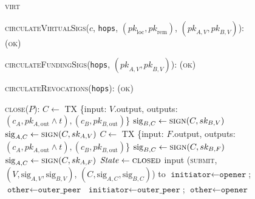 \begin{figure}[H]
\begin{processbox}{\textsc{virt}}
\begin{algorithmic}[1]
      \State \textsc{circulateVirtualSigs}($c$, \texttt{hops},
      $(\textit{pk}_\mathrm{loc}, \textit{pk}_\mathrm{rem})$, $(\textit{pk}_{A,
      V}, \textit{pk}_{B, V})$):
      \Indent
        \State \Return (\textsc{ok})
      \EndIndent
      \Statex

      \State \textsc{circulateFundingSigs}(\texttt{hops}, $(\textit{pk}_{A, V},
      \textit{pk}_{B, V})$):
      \Indent
        \State \Return (\textsc{ok})
      \EndIndent
      \Statex

      \State \textsc{circulateRevocations}(\texttt{hops}):
      \Indent
        \State \Return (\textsc{ok})
      \EndIndent
      \Statex

      \State \textsc{close}($P$):
            \State {}
            \State $C \gets$ TX \{input: $V$.output, outputs: $(c_A, pk_{A,
            \mathrm{out}} \wedge t), (c_B, pk_{B, \mathrm{out}})$\}
            \State $\mathrm{sig}_{B, C} \gets \textsc{sign}(C, sk_{B, V})$
            \State $\mathrm{sig}_{A, C} \gets \textsc{sign}(C, sk_{A, V})$
          \Else
            \State $C \gets$ TX \{input: $F$.output, outputs: $(c_A, pk_{A,
            \mathrm{out}} \wedge t), (c_B, pk_{B, \mathrm{out}})$\}
            \State $\mathrm{sig}_{B, C} \gets \textsc{sign}(C, sk_{B, F})$
            \State $\mathrm{sig}_{A, C} \gets \textsc{sign}(C, sk_{A, F})$
          \EndIf
        \EndIf \: 
        \State $\mathit{State} \gets \textsc{closed}$
          \State input (\textsc{submit}, $(V, \mathrm{sig}_{A, V},
          \mathrm{sig}_{B, V})$, $(C, \mathrm{sig}_{A, C}, \mathrm{sig}_{B,
          C})$) to \ledger
        \Else \: 
            \State $\texttt{initiator} \gets \texttt{opener}$; $\texttt{other}
            \gets \texttt{outer\_peer}$
          \Else \: 
            \State $\texttt{initiator} \gets \texttt{outer\_peer}$;
            $\texttt{other} \gets \texttt{opener}$
          \EndIf

\end{algorithmic}
\end{processbox}
\end{figure}
